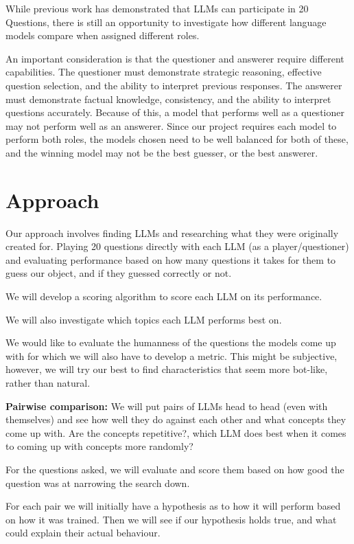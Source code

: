 \documentclass[10pt]{article}
\begin{document}
While previous work has demonstrated that LLMs can participate in 20 Questions,
there is still an opportunity to investigate how different language models
compare when assigned different roles.

An important consideration is that the questioner and answerer require
different capabilities. The questioner must demonstrate strategic reasoning,
effective question selection, and the ability to interpret previous responses.
The answerer must demonstrate factual knowledge, consistency, and the ability
to interpret questions accurately. Because of this, a model that performs well
as a questioner may not perform well as an answerer. Since our project requires
each model to perform both roles, the models chosen need to be well balanced
for both of these, and the winning model may not be the best guesser, or the
best answerer.

\section{Approach}

Our approach involves finding LLMs and researching what they were originally
created for. Playing 20 questions directly with each LLM (as a
player/questioner) and evaluating performance based on how many questions it
takes for them to guess our object, and if they guessed correctly or not.

We will develop a scoring algorithm to score each LLM on its performance.

We will also investigate which topics each LLM performs best on.

We would like to evaluate the humanness of the questions the models come up
with for which we will also have to develop a metric. This might be subjective,
however, we will try our best to find characteristics that seem more bot-like,
rather than natural.

\textbf{Pairwise comparison:} We will put pairs of LLMs head to head (even with
themselves) and see how well they do against each other and what concepts they
come up with. Are the concepts repetitive?, which LLM does best when it comes
to coming up with concepts more randomly?

For the questions asked, we will evaluate and score them based on how good the
question was at narrowing the search down.

For each pair we will initially have a hypothesis as to how it will perform
based on how it was trained. Then we will see if our hypothesis holds true, and
what could explain their actual behaviour.
\end{document}

